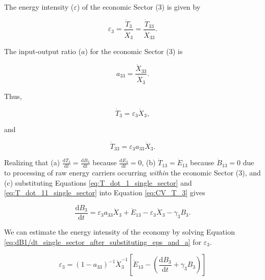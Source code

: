\documentclass[authoryear,preprint,review,12pt]{elsarticle}
\begin{document}
The energy intensity ($\varepsilon$) of the economic Sector (3) is given by

\begin{equation} \label{eq:single_sector_energy_intensity}
	\varepsilon_{3} = \frac{\dot{T}_{3}}{\dot{X}_{3}} = \frac{\dot{T}_{33}}{\dot{X}_{33}}.
\end{equation}

The input-output ratio ($a$) for the economic Sector (3) is

\begin{equation} \label{eq:io_ratio_single_sector}
	a_{33} = \frac{\dot{X}_{33}}{\dot{X}_{3}}.
\end{equation}

\noindent Thus,

\begin{equation} \label{eq:T_dot_1_single_sector}
	\dot{T}_{3} = \varepsilon_{3}\dot{X}_{3},
\end{equation}

\noindent and

\begin{equation} \label{eq:T_dot_11_single_sector}
	\dot{T}_{33} = \varepsilon_{3}a_{33}\dot{X}_{3}.
\end{equation}

Realizing that (a) $\frac{\mathrm{d}T_3}{\mathrm{d}t} = \frac{\mathrm{d}B_3}{\mathrm{d}t}$ because $\frac{\mathrm{d}E_3}{\mathrm{d}t} = 0$, (b) $\dot{T}_{13} = \dot{E}_{13}$ because $\dot{B}_{13} = 0$ due to processing of raw energy carriers occurring \emph{within} the economic Sector (3), and (c) substituting Equations \ref{eq:T_dot_1_single_sector} and \ref{eq:T_dot_11_single_sector} into Equation \ref{eq:CV_T_3} gives

\begin{equation} \label{eq:dB1/dt_single_sector_after_substituting_eps_and_a}
	\frac{\mathrm{d}B_{3}}{\mathrm{d}t} = \varepsilon_{3}a_{33}\dot{X}_{3} + \dot{E}_{13} - \varepsilon_{3}\dot{X}_{3} - \gamma_{3}B_{3}.
\end{equation}

We can estimate the energy intensity of the economy by solving Equation \ref{eq:dB1/dt_single_sector_after_substituting_eps_and_a} for $\varepsilon_{3}$.

\begin{equation} \label{eq:eps3_ss_IO}
	\varepsilon_{3} = (1 - a_{33})^{-1} \dot{X}_{3}^{-1} \left[\dot{E}_{13} - \left(\frac{\mathrm{d}B_{3}}{\mathrm{d}t} + \gamma_{3}B_{3}\right)\right]
\end{equation}
\end{document}
